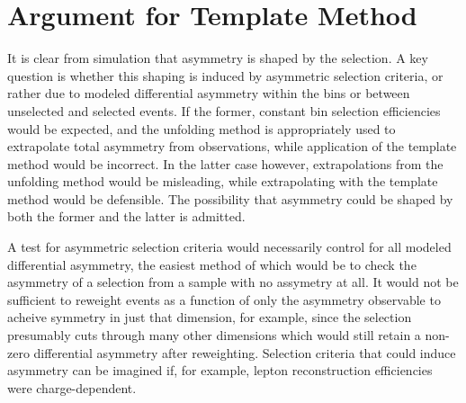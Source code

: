 \documentclass[letterpaper,11pt]{article}
\newcommand{\selected}{{\ensuremath s}}
\begin{document}
%

\section{Argument for Template Method}

It is clear from simulation that asymmetry is shaped by the selection.
A key question is whether this shaping is induced by asymmetric
selection criteria, or rather due to modeled differential asymmetry
within the bins or between unselected and selected events.  If the
former, constant bin selection efficiencies would be expected, and the
unfolding method is appropriately used to extrapolate total asymmetry
from observations, while application of the template method would be
incorrect.  In the latter case however, extrapolations from the
unfolding method would be misleading, while extrapolating with the
template method would be defensible.  The possibility that asymmetry
could be shaped by both the former and the latter is admitted.

A test for asymmetric selection criteria would necessarily control for
all modeled differential asymmetry, the easiest method of which would
be to check the asymmetry of a selection from a sample with no
assymetry at all. It would not be sufficient to reweight events as a
function of only the asymmetry observable to acheive symmetry in just
that dimension, for example, since the selection presumably cuts
through many other dimensions which would still retain a non-zero
differential asymmetry after reweighting.  Selection criteria that
could induce asymmetry can be imagined if, for example, lepton
reconstruction efficiencies were charge-dependent.
\end{document}
